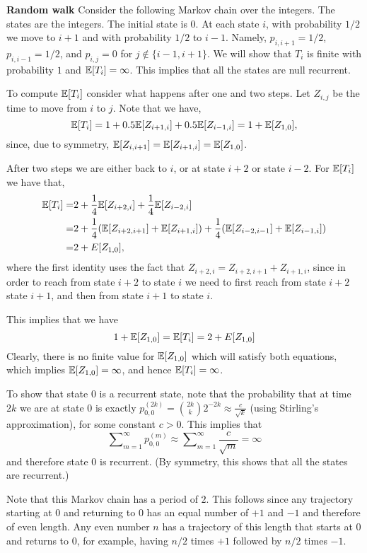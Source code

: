\begin{example}{\bf Random walk}
Consider the following Markov chain over the integers. The states
are the integers. The initial state is $0$. At each state $i$, with
probability $1/2$ we move to $i+1$ and with probability $1/2$ to
$i-1$. Namely, $p_{i,i+1}=1/2$, $p_{i,i-1}=1/2$, and $p_{i,j} =0$
for $j \not\in \{i-1,i+ 1\}$. We will show that $T_i$ is finite with
probability $1$ and $\mathbb{E}[T_i]=\infty$. This implies that all the
states are null recurrent.

To compute $\mathbb{E}[T_i]$ consider what happens after one and two steps. Let
$Z_{i,j}$ be the time to move from $i$ to $j$. Note that we have,
\[
\mathbb{E}[T_i]=1+0.5\mathbb{E}[Z_{i+1,i}]+0.5\mathbb{E}[Z_{i-1,i}]=1+\mathbb{E}[Z_{1,0}],
\]
since, due to symmetry, $\mathbb{E}[Z_{i,i+1}]=\mathbb{E}[Z_{i+1,i}]=\mathbb{E}[Z_{1,0}]$.

After two steps we are either back to $i$, or at state $i+2$ or state $i-2$.
For $\mathbb{E}[T_i]$ we have that,
\begin{align*}
\mathbb{E}[T_i]=&
2+\frac{1}{4}\mathbb{E}[Z_{i+2,i}]+\frac{1}{4}\mathbb{E}[Z_{i-2,i}] \\
=&2+\frac{1}{4} (\mathbb{E}[Z_{i+2,i+1}]+\mathbb{E}[Z_{i+1,i}])+\frac{1}{4}( \mathbb{E}[Z_{i-2,i-1}]+\mathbb{E}[Z_{i-1,i}])\\
 =&2+E[Z_{1,0}],
\end{align*}
where the first identity uses the fact that $Z_{i+2,i}=Z_{i+2,i+1}+Z_{i+1,i}$, since in order to reach from state $i+2$ to state $i$ we need to first reach from state $i+2$ state $i+1$, and then from state $i+1$ to state $i$.

This implies that we have
\[
1+\mathbb{E}[Z_{1,0}]=\mathbb{E}[T_i]=2+E[Z_{1,0}]
\]
Clearly, there is no finite value for $\mathbb{E}[Z_{1,0}]$ which will
satisfy both equations, which implies $\mathbb{E}[Z_{1,0}]=\infty$, and hence
$\mathbb{E}[T_i]=\infty$.

To show that state $0$ is a recurrent state, note that the probability
that at time $2k$ we are at state $0$ is exactly $p_{0,0}^{(2k)}=\binom{2k}{k}2^{-2k}\approx \frac{c}{\sqrt{k}}$ (using Stirling's approximation), for some constant $c>0$. This
implies that
$$
\sum\nolimits_{m = 1}^\infty {p_{0,0}^{(m)}}\approx \sum\nolimits_{m
= 1}^\infty \frac{c}{\sqrt{m}}=\infty
$$
and therefore state $0$ is recurrent. (By symmetry, this shows that
all the states are recurrent.)

Note that this Markov chain has a period of $2$. This follows since any trajectory starting at $0$ and returning to $0$ has an equal number of $+1$ and $-1$ and therefore of even length. Any even number $n$ has a trajectory of this length that starts at $0$ and returns to $0$, for example, having $n/2$ times $+1$ followed by $n/2$ times $-1$.
\end{example}

